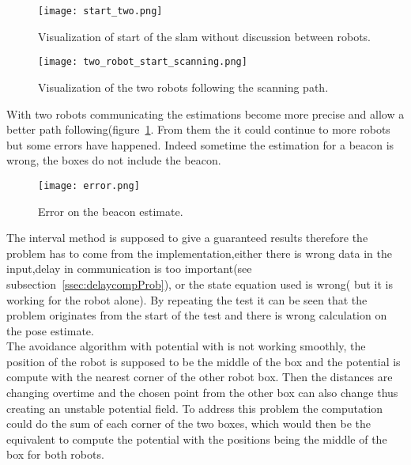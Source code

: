 \begin{figure}[H]
\centering
\begin{minipage}[b]{0.4\textwidth}
\texttt{[image: start\_two.png]}
\caption{Visualization of start of the slam without discussion between robots.}
\label{fig:twoRobResDeb}
\end{minipage}
\begin{minipage}[b]{0.4\textwidth}
\texttt{[image: two\_robot\_start\_scanning.png]}
\caption{Visualization of the two robots following the scanning path.}
\label{fig:twoRobResEnd}
\end{minipage}
\end{figure}

With two robots communicating the estimations become more precise and allow a better path following(figure~\ref{fig:twoRobResEnd}.
From them the it could continue to more robots but some errors have happened. Indeed sometime the estimation for a beacon is wrong, the boxes do not include the beacon.

\begin{figure}[H]
\centering
\texttt{[image: error.png]}
\caption{Error on the beacon estimate.}
\label{fig:errorEst}
\end{figure}

The interval method is supposed to give a guaranteed results therefore the problem has to come from the implementation,either there is wrong data in the input,delay in communication is too important(see subsection~\ref{ssec:delaycompProb}), or the state equation used is wrong( but it is working for the robot alone).
By repeating the test it can be seen that the problem originates from the start of the test and there is wrong calculation on the pose estimate.\\

The avoidance algorithm with potential with is not working smoothly, the position of the robot is supposed to be the middle of the box and the potential is compute with the nearest corner of the other robot box. Then the distances are changing overtime and the chosen point from the other box can also change thus  creating an unstable potential field. To address this problem the computation could do the sum of each corner of the two boxes, which would then be the equivalent to compute the potential with the positions being the middle of the box for both robots.